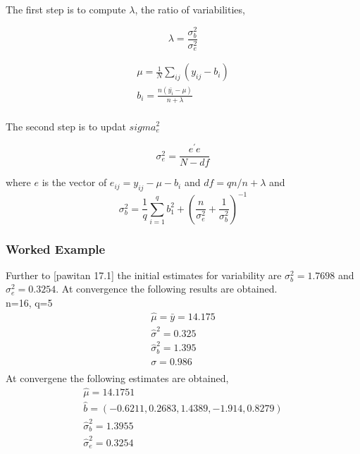\documentclass[12pt, a4paper]{report}
\theoremstyle{plain}
\theoremstyle{definition}
\theoremstyle{remark}
\begin{document}
	The first step is to compute $\lambda$, the ratio of variabilities,
	
	\begin{equation*}
	\lambda = \frac{\sigma^2_{b}}{\sigma^2_{e}}
	\end{equation*}
	
	\begin{eqnarray*}
		\mu = \frac{1}{N} \sum_{ij} (y_{ij} - b_{i}) \\
		b_{i} = \frac{n(\bar{y_{i}}-\mu)}{n+ \lambda} \\
	\end{eqnarray*}
	
	
	The second step is to updat $sigma^2_{e}$
	
	\begin{equation}
	\sigma^2_{e} = \frac{e^{\prime}e}{N-df}
	\end{equation}
	
	where $e$ is the vector of $e_{ij} = y_{ij}-\mu-b_{i}$ and $df =
	qn / n+\lambda$ and
	\begin{equation}
	\sigma^{2}_{b} = \frac{1}{q} \sum_{i=1}^{q} b_{1}^2 +
	(\frac{n}{\sigma^2_{e}}+\frac{1}{\sigma^2_{b}})^{-1}
	\end{equation}
	
	\subsubsection{Worked Example}
	
	Further to [pawitan 17.1] the initial estimates for variability
	are $\sigma^{2}_{b} = 1.7698$ and $\sigma^{2}_{e} = 0.3254$. At
	convergence the following results are obtained.
	\\
	n=16, q=5
	\begin{eqnarray*}
		\hat{\mu} = \bar{y} = 14.175 \\
		\hat{\sigma}^2 = 0.325\\
		\hat{\sigma}^2_{b} = 1.395\\
		\sigma  = 0.986 \\
	\end{eqnarray*}
	At convergene the following estimates are obtained,
	\begin{eqnarray*}
		\hat{\mu} = 14.1751 \\
		\hat{b}= (-0.6211, 0.2683,1.4389,-1.914,0.8279)\\
		\hat{\sigma}^2_{b} = 1.3955\\
		\hat{\sigma}^2_{e} = 0.3254\\
	\end{eqnarray*}
	
\end{document}

